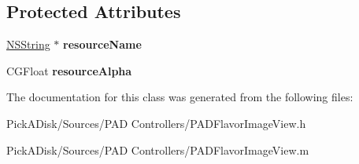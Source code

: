 \subsection*{Protected Attributes}
\begin{DoxyCompactItemize}
\item 
\hypertarget{interface_p_a_d_named_image_view_a54cf083548bd03a5cfdc477a565c8ac8}{
\hyperlink{class_n_s_string}{NSString} $\ast$ {\bfseries resourceName}}
\label{interface_p_a_d_named_image_view_a54cf083548bd03a5cfdc477a565c8ac8}

\item 
\hypertarget{interface_p_a_d_named_image_view_ad868d9616913d82a63d5b5a6c438c0be}{
CGFloat {\bfseries resourceAlpha}}
\label{interface_p_a_d_named_image_view_ad868d9616913d82a63d5b5a6c438c0be}

\end{DoxyCompactItemize}


The documentation for this class was generated from the following files:\begin{DoxyCompactItemize}
\item 
PickADisk/Sources/PAD Controllers/PADFlavorImageView.h\item 
PickADisk/Sources/PAD Controllers/PADFlavorImageView.m\end{DoxyCompactItemize}
